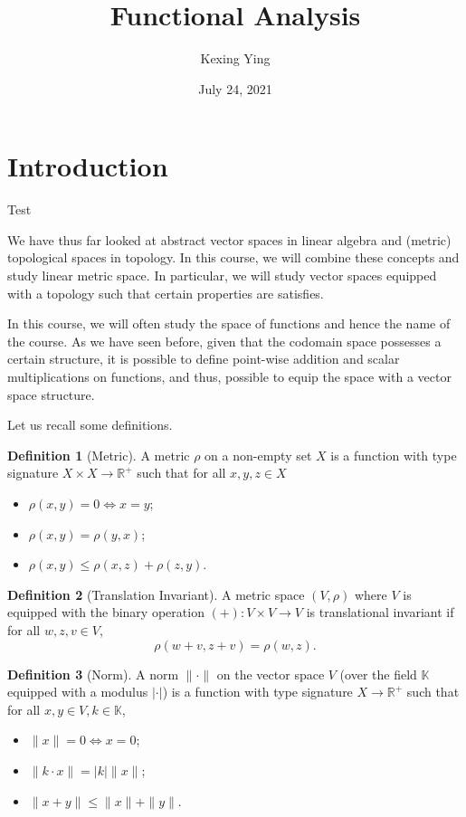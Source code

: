 \documentclass[]{article}
\title{Functional Analysis}
\author{Kexing Ying}
\date{July 24, 2021}
\theoremstyle{definition}
\theoremstyle{definition}
\newtheorem{definition}{Definition}[section]
\begin{document}
\maketitle

{
\hypersetup{linkcolor=}
\setcounter{tocdepth}{2}
\tableofcontents
}
\newpage

\section{Introduction}

Test

We have thus far looked at abstract vector spaces in linear algebra and 
(metric) topological spaces in topology. In this course, we will combine these 
concepts and study linear metric space. In particular, we will study 
vector spaces equipped with a topology such that certain properties are 
satisfies. 

In this course, we will often study the space of functions and hence 
the name of the course. As we have seen before, given that the codomain space 
possesses a certain structure, it is possible to define point-wise addition and 
scalar multiplications on functions, and thus, possible to equip the space 
with a vector space structure. 

Let us recall some definitions.

\begin{definition}[Metric]
  A metric \(\rho\) on a non-empty set \(X\) is a function with type signature 
  \(X \times X \to \mathbb{R}^+\) such that for all \(x, y, z \in X\)
  \begin{itemize}
    \item \(\rho(x, y) = 0 \iff x = y\);
    \item \(\rho(x, y) = \rho (y, x)\);
    \item \(\rho(x, y) \le \rho(x, z) + \rho(z, y)\).
  \end{itemize}
\end{definition}

\begin{definition}[Translation Invariant]
  A metric space \((V, \rho)\) where \(V\) is equipped with the binary operation 
  \((+) : V \times V \to V\) is translational invariant if for all \(w, z, v \in V\), 
  \[\rho(w + v, z + v) = \rho(w, z).\]
\end{definition}

\begin{definition}[Norm]
  A norm \(\|\cdot\|\) on the vector space \(V\) (over the field 
  \(\mathbb{K}\) equipped with a modulus \(|\cdot|\)) 
  is a function with type signature \(X \to \mathbb{R}^+\) such that for all 
  \(x, y \in V, k \in \mathbb{K}\),
  \begin{itemize}
    \item \(\|x\| = 0 \iff x = 0\);
    \item \(\|k \cdot x\| = |k| \|x\|\);
    \item \(\|x + y\| \le \|x\| + \|y\|\).
  \end{itemize} 
\end{definition}
\end{document}
